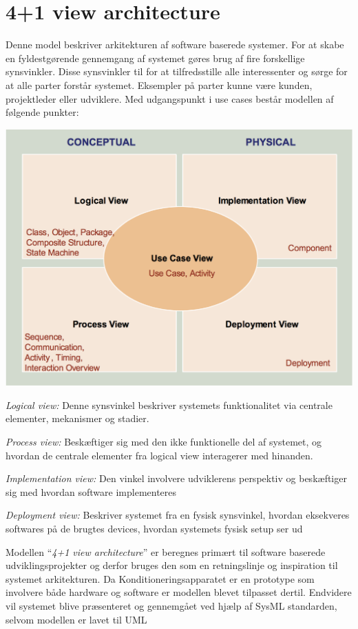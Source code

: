 \section{4+1 view architecture}
Denne model beskriver arkitekturen af software baserede systemer. For at skabe en fyldestgørende gennemgang af systemet gøres brug af fire forskellige synsvinkler. Disse synsvinkler til for at tilfredsstille alle interessenter og sørge for at alle parter forstår systemet. Eksempler på parter kunne være kunden, projektleder eller udviklere. Med udgangspunkt i use cases består modellen af følgende punkter: 

\includegraphics[width=\textwidth]{filer/4plus1model.png}

\textit{Logical view:} Denne synsvinkel beskriver systemets funktionalitet via centrale elementer, mekanismer og stadier.

\textit{Process view:} Beskæftiger sig med den ikke funktionelle del af systemet, og hvordan de centrale elementer fra logical view interagerer med hinanden.

\textit{Implementation view:} Den vinkel involvere udviklerens perspektiv og beskæftiger sig med hvordan software implementeres

\textit{Deployment view:} Beskriver systemet fra en fysisk synsvinkel, hvordan eksekveres softwares på de brugtes devices, hvordan systemets fysisk setup ser ud 

Modellen “\textit{4+1 view architecture}” er beregnes primært til software baserede udviklingsprojekter og derfor bruges den som en retningslinje og inspiration til systemet arkitekturen. Da Konditioneringsapparatet er en prototype som involvere både hardware og software er modellen blevet tilpasset dertil. Endvidere vil systemet blive præsenteret og gennemgået ved hjælp af SysML standarden, selvom modellen er lavet til UML

